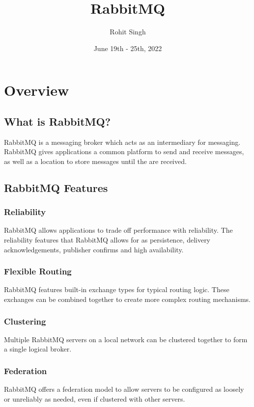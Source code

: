 \documentclass{article}
\title{RabbitMQ}
\author{Rohit Singh}
\date{June 19th - 25th, 2022}
\begin{document}
\maketitle

\tableofcontents

\section{Overview}

\subsection{What is RabbitMQ?}

RabbitMQ is a messaging broker which acts as an intermediary for messaging. RabbitMQ gives applications a common platform to send and receive messages, as well as a location to store messages until the are received.

\subsection{RabbitMQ Features}

\subsubsection{Reliability}

RabbitMQ allows applications to trade off performance with reliability. The reliability features that RabbitMQ allows for as persistence, delivery acknowledgements, publisher confirms and high availability.

\subsubsection{Flexible Routing}

RabbitMQ features built-in exchange types for typical routing logic. These exchanges can be combined together to create more complex routing mechanisms.

\subsubsection{Clustering}

Multiple RabbitMQ servers on a local network can be clustered together to form a single logical broker.

\subsubsection{Federation}
RabbitMQ offers a federation model to allow servers to be configured as loosely or unreliably as needed, even if clustered with other servers.
\end{document}
